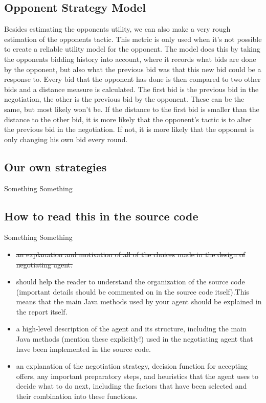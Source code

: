 \subsection*{Opponent Strategy Model}
Besides estimating the opponents utility, we can also make a very rough estimation of the opponents tactic. This metric is only used when it's not possible to create a reliable utility model for the opponent. The model does this by taking the opponents bidding history into account, where it records what bids are done by the opponent, but also what the previous bid was that this new bid could be a response to. Every bid that the opponent has done is then compared to two other bids and a distance measure is calculated. The first bid is the previous bid in the negotiation, the other is the previous bid by the opponent. These can be the same, but most likely won't be. If the distance to the first bid is smaller than the distance to the other bid, it is more likely that the opponent's tactic is to alter the previous bid in the negotiation. If not, it is more likely that the opponent is only changing his own bid every round. 

\subsection*{Our own strategies}
Something Something\\

\subsection*{How to read this in the source code}
Something Something\\

\begin{itemize}
\item \st{an explanation and motivation of all of the choices made in the design of negotiating agent.}
\item should help the reader to understand the organization of the source code (important details should be commented on in the source code itself).This means that the main Java methods used by your agent should be explained in the report itself.
\item a high-level description of the agent and its structure, including the main Java methods (mention these explicitly!) used in the negotiating agent that have been implemented in the source code.
\item an explanation of the negotiation strategy, decision function for accepting offers, any important preparatory steps, and heuristics that the agent uses to decide what to do next, including the factors that have been selected and their combination into these functions.
\end{itemize}